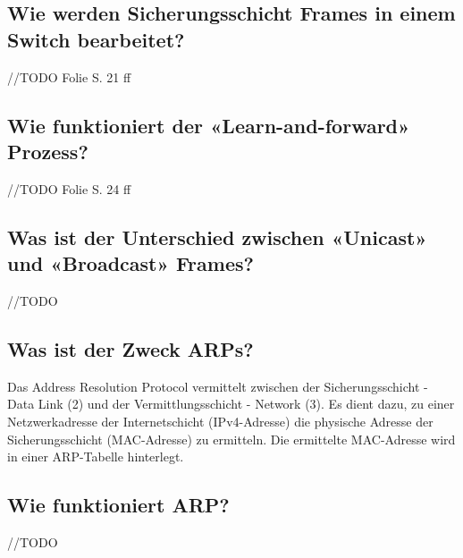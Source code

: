 \subsection*{Wie werden Sicherungsschicht Frames in einem Switch bearbeitet? }
//TODO Folie S. 21 ff

\subsection*{Wie funktioniert der «Learn-and-forward» Prozess?}
//TODO Folie S. 24 ff

\subsection*{Was ist der Unterschied zwischen «Unicast» und «Broadcast» Frames?}
//TODO

\subsection*{Was ist der Zweck ARPs?}
Das Address Resolution Protocol vermittelt zwischen der Sicherungsschicht - Data Link (2) und der Vermittlungsschicht - Network (3). Es dient dazu, zu einer Netzwerkadresse der Internetschicht (IPv4-Adresse) die physische Adresse der Sicherungsschicht (MAC-Adresse) zu ermitteln. Die ermittelte MAC-Adresse wird in einer ARP-Tabelle hinterlegt.

\subsection*{Wie funktioniert ARP?}
//TODO
